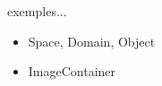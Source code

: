 



\begin{frame}

exemples...

\begin{itemize}
\item Space, Domain, Object
\item ImageContainer
\end{itemize}
\end{frame}



